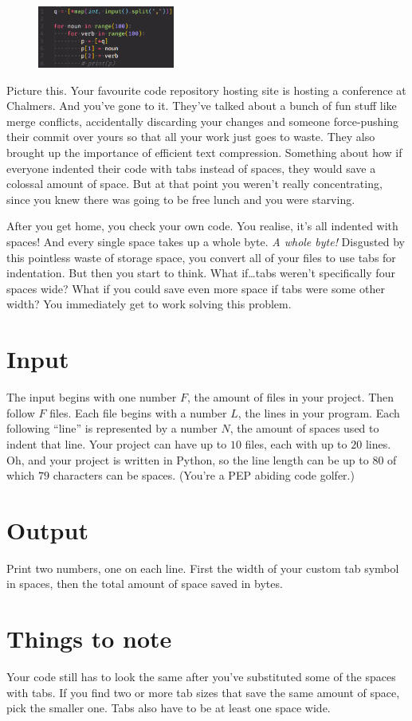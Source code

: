 
\begin{figure}
    \centering
    \includegraphics[width=0.4\textwidth]{code}
\end{figure}

\noindent
Picture this. Your favourite code repository hosting site is hosting a conference at
Chalmers. And you've gone to it. They've talked about a bunch of fun stuff like
merge conflicts, accidentally discarding your changes and someone force-pushing
their commit over yours so that all your work just goes to waste. They also
brought up the importance of efficient text compression. Something about how if
everyone indented their code with tabs instead of spaces, they would save a
colossal amount of space.  But at that point you weren't really concentrating,
since you knew there was going to be free lunch and you were starving.

After you get home, you check your own code. You realise, it's all indented
with spaces! And every single space takes up a whole byte. \textit{A whole
byte!} Disgusted by this pointless waste of storage space, you convert all of
your files to use tabs for indentation. But then you start to think. What
if\ldots tabs weren't specifically four spaces wide? What if you could save even
more space if tabs were some other width? You immediately get to work solving
this problem.

\section*{Input}

The input begins with one number $F$, the amount of files in your project. Then
follow $F$ files. Each file begins with a number $L$, the lines in your
program. Each following ``line'' is represented by a number $N$, the amount of
spaces used to indent that line. Your project can have up to $10$ files, each
with up to $20$ lines. Oh, and your project is written in Python, so the line length
can be up to $80$ of which $79$ characters can be spaces. (You're a PEP abiding code
golfer.)

\section*{Output}

Print two numbers, one on each line. First the width of your custom tab symbol
in spaces, then the total amount of space saved in bytes.

\section*{Things to note}

Your code still has to look the same after you've substituted some of the spaces
with tabs. If you find two or more tab sizes that save the same amount of space,
pick the smaller one. Tabs also have to be at least one space wide.
